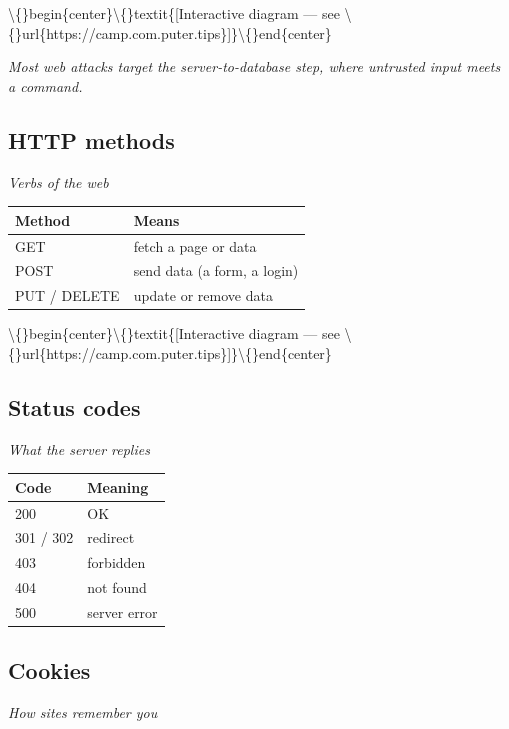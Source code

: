 \documentclass[12pt,openany]{book}
\begin{document}
\textbackslash\{\}begin\{center\}\textbackslash\{\}textit\{[Interactive diagram --- see \textbackslash\{\}url\{https://camp.com.puter.tips\}]\}\textbackslash\{\}end\{center\}

{\small\itshape\color{gray}Most web attacks target the server-to-database step, where untrusted input meets a command.}

\medskip

\subsection*{HTTP methods}
{\small\itshape\color{gray}Verbs of the web}


\begin{center}\small\begin{tabular}{p{6.5cm}p{6.5cm}}\toprule
\textbf{Method} & \textbf{Means} \\ \midrule
GET & fetch a page or data \\
POST & send data (a form, a login) \\
PUT / DELETE & update or remove data \\
\bottomrule\end{tabular}\end{center}


\textbackslash\{\}begin\{center\}\textbackslash\{\}textit\{[Interactive diagram --- see \textbackslash\{\}url\{https://camp.com.puter.tips\}]\}\textbackslash\{\}end\{center\}

\medskip

\subsection*{Status codes}
{\small\itshape\color{gray}What the server replies}


\begin{center}\small\begin{tabular}{p{6.5cm}p{6.5cm}}\toprule
\textbf{Code} & \textbf{Meaning} \\ \midrule
200 & OK \\
301 / 302 & redirect \\
403 & forbidden \\
404 & not found \\
500 & server error \\
\bottomrule\end{tabular}\end{center}

\medskip

\subsection*{Cookies}
{\small\itshape\color{gray}How sites remember you}
\end{document}
